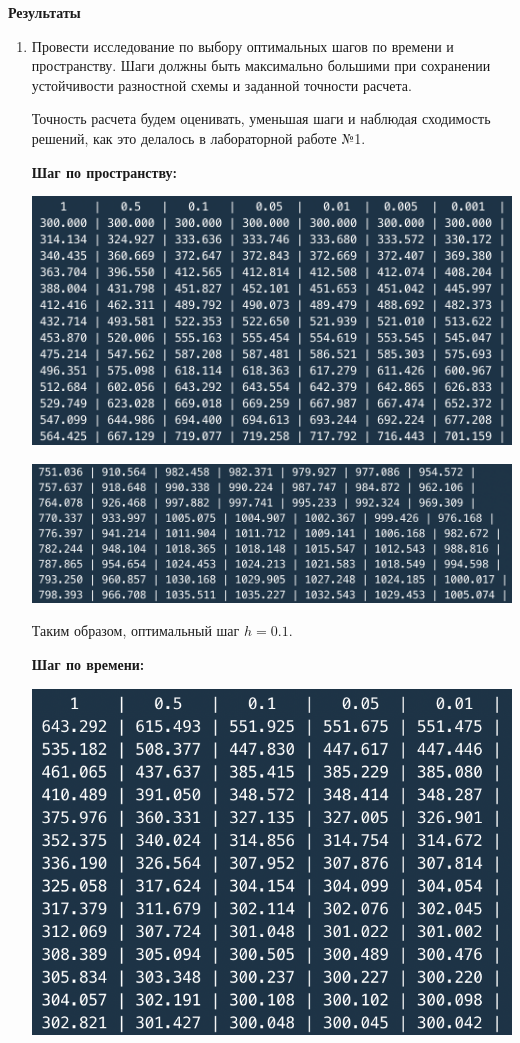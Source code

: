 \documentclass[a4paper,14pt]{extreport} %
\begin{document}
\textbf{Результаты}


\begin{enumerate}
\item Провести исследование по выбору оптимальных шагов по времени и пространству. Шаги должны быть максимально большими при сохранении устойчивости разностной схемы и заданной точности расчета. 

Точность расчета будем оценивать, уменьшая шаги и наблюдая сходимость решений, как это делалось в лабораторной работе №1. 

\textbf{Шаг по пространству:}

\includegraphics{1}

\includegraphics{2}

Таким образом, оптимальный шаг $h=0.1$. 

\textbf{Шаг по времени:}

\includegraphics{3}


\end{enumerate}
\end{document}
